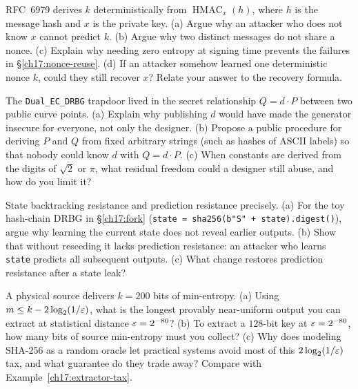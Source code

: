\begin{exercise}
RFC~6979 derives $k$ deterministically from $\operatorname{HMAC}_x(h)$, where $h$ is the message hash and $x$ is the private key. (a) Argue why an attacker who does not know $x$ cannot predict $k$. (b) Argue why two distinct messages do not share a nonce. (c) Explain why needing zero entropy at signing time prevents the failures in \S\ref{ch17:nonce-reuse}. (d) If an attacker somehow learned one deterministic nonce $k$, could they still recover $x$? Relate your answer to the recovery formula.
\end{exercise}

\begin{exercise}
The \texttt{Dual\_EC\_DRBG} trapdoor lived in the secret relationship $Q = d \cdot P$ between two public curve points. (a) Explain why publishing $d$ would have made the generator insecure for everyone, not only the designer. (b) Propose a public procedure for deriving $P$ and $Q$ from fixed arbitrary strings (such as hashes of ASCII labels) so that nobody could know $d$ with $Q = d \cdot P$. (c) When constants are derived from the digits of $\sqrt{2}$ or $\pi$, what residual freedom could a designer still abuse, and how do you limit it?
\end{exercise}

\begin{exercise}
State backtracking resistance and prediction resistance precisely. (a) For the toy hash-chain DRBG in \S\ref{ch17:fork} (\texttt{state = sha256(b"S" + state).digest()}), argue why learning the current state does not reveal earlier outputs. (b) Show that without reseeding it lacks prediction resistance: an attacker who learns \texttt{state} predicts all subsequent outputs. (c) What change restores prediction resistance after a state leak?
\end{exercise}

\begin{exercise}
A physical source delivers $k = 200$ bits of min-entropy. (a) Using $m \le k - 2\log_2(1/\varepsilon)$, what is the longest provably near-uniform output you can extract at statistical distance $\varepsilon = 2^{-80}$? (b) To extract a $128$-bit key at $\varepsilon = 2^{-80}$, how many bits of source min-entropy must you collect? (c) Why does modeling SHA-256 as a random oracle let practical systems avoid most of this $2\log_2(1/\varepsilon)$ tax, and what guarantee do they trade away? Compare with Example~\ref{ch17:extractor-tax}.
\end{exercise}

